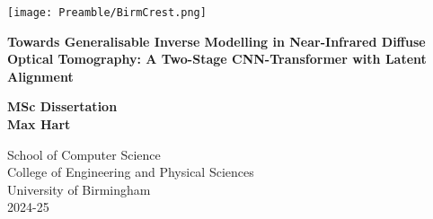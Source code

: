
\thispagestyle{empty}

\begin{spacing}{2}
	\begin{center}
		\texttt{[image: Preamble/BirmCrest.png]}
	\end{center}
	\vspace{10mm}
	\begin{center}
		\textbf{\Large Towards Generalisable Inverse Modelling in Near-Infrared Diffuse Optical Tomography: A Two-Stage CNN-Transformer with Latent Alignment}
		\vspace{10mm}
	\end{center}
	\begin{center}
		\textbf{\large MSc Dissertation}
		\vspace{20mm}
		\\\textbf{\Large Max Hart}
		\vspace{30mm}
	\end{center}
	\begin{center}
		{\large School of Computer Science}
		\\ {\large College of Engineering and Physical Sciences}
		\\ {\large University of Birmingham}
		\\ {\large 2024-25}
	\end{center}
\end{spacing}


